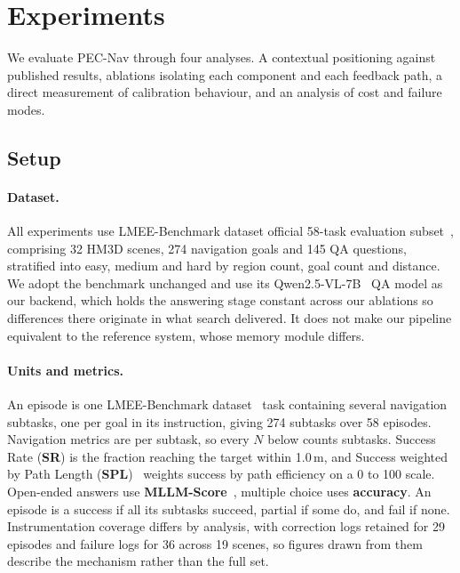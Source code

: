 \section{Experiments}

We evaluate PEC-Nav through four analyses. A contextual positioning against published results, ablations isolating each component and each feedback path, a direct measurement of calibration behaviour, and an analysis of cost and failure modes.

\subsection{Setup}
\label{sec:setup}

\paragraph{Dataset.} All experiments use LMEE-Benchmark dataset official 58-task evaluation subset~\cite{wang2026memoryexplorer}, comprising 32 HM3D scenes, 274 navigation goals and 145 QA questions, stratified into easy, medium and hard by region count, goal count and distance. We adopt the benchmark unchanged and use its Qwen2.5-VL-7B~\cite{bai2025qwen25vl} QA model as our backend, which holds the answering stage constant across our ablations so differences there originate in what search delivered. It does not make our pipeline equivalent to the reference system, whose memory module differs.

\paragraph{Units and metrics.} An episode is one LMEE-Benchmark dataset~\cite{wang2026memoryexplorer} task containing several navigation subtasks, one per goal in its instruction, giving 274 subtasks over 58 episodes. Navigation metrics are per subtask, so every $N$ below counts subtasks. Success Rate (\textbf{SR}) is the fraction reaching the target within 1.0\,m, and Success weighted by Path Length (\textbf{SPL})~\cite{anderson2018spl} weights success by path efficiency on a 0 to 100 scale. Open-ended answers use \textbf{MLLM-Score}~\cite{wang2026memoryexplorer}, multiple choice uses \textbf{accuracy}. An episode is a success if all its subtasks succeed, partial if some do, and fail if none. Instrumentation coverage differs by analysis, with correction logs retained for 29 episodes and failure logs for 36 across 19 scenes, so figures drawn from them describe the mechanism rather than the full set.

